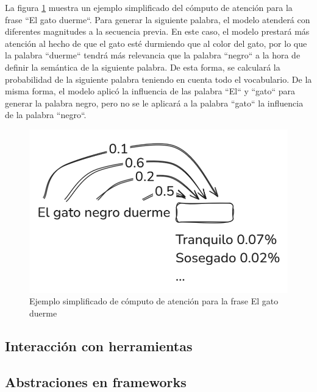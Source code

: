 La figura \ref{fig:atencion_gato} muestra un ejemplo simplificado del cómputo de atención para la frase ``El gato duerme``. Para generar la siguiente palabra, el modelo atenderá con diferentes magnitudes a la secuencia previa. En este caso, el modelo prestará más atención al hecho de que el gato esté durmiendo que al color del gato, por lo que la palabra  ``duerme`` tendrá más relevancia que la palabra ``negro`` a la hora de definir la semántica de la siguiente palabra. De esta forma, se calculará la probabilidad de la siguiente palabra teniendo en cuenta todo el vocabulario. De la misma forma, el modelo aplicó la influencia de las palabra ``El`` y ``gato`` para generar la palabra negro, pero no se le aplicará a la palabra ``gato`` la influencia de la palabra ``negro``.


\begin{figure}
    \centering
    \includegraphics[width=0.65\linewidth]{figures/atencion_poc.png}
    \caption{Ejemplo simplificado de cómputo de atención para la frase \textquotedbl El gato duerme\textquotedbl}
    \label{fig:atencion_gato}
\end{figure}

\subsection{Interacción con herramientas}

\subsection{Abstraciones en frameworks}










